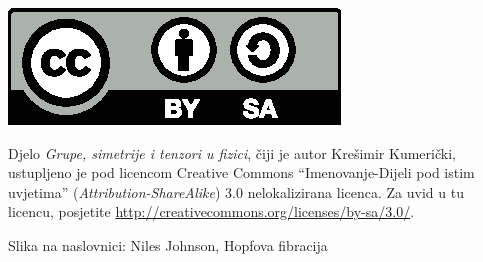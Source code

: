 
\thispagestyle{empty}

\vspace*{22em}

\centerline{\includegraphics[scale=1.0,clip]{pics/by-sa.eps}}
Djelo \emph{Grupe, simetrije i tenzori u fizici}, čiji je autor Krešimir
Kumerički, ustupljeno je pod licencom Creative Commons 
``Imenovanje-Dijeli pod istim uvjetima'' (\emph{Attribution-ShareAlike}) 
3.0 nelokalizirana licenca.
Za uvid u tu licencu, posjetite
\url{http://creativecommons.org/licenses/by-sa/3.0/}.

\vspace*{5em}
Slika na naslovnici: Niles Johnson, Hopfova fibracija

